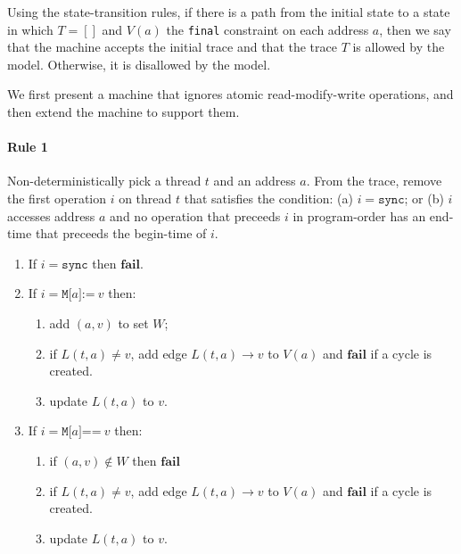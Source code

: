 \documentclass[11pt]{article}
\begin{document}
Using the state-transition rules, if there is a path from the initial
state to a state in which $T = []$ and $V(a)$ the \verb#final#
constraint on each address $a$, then we say that the machine accepts
the initial trace and that the trace $T$ is allowed by the model.
Otherwise, it is disallowed by the model.

We first present a machine that ignores atomic read-modify-write
operations, and then extend the machine to support them.

\paragraph{Rule 1}

Non-deterministically pick a thread $t$ and an address $a$.  From the
trace, remove the first operation $i$ on thread $t$ that satisfies the
condition: (a) $i = \texttt{sync}$; or (b) $i$ accesses address $a$
and no operation that preceeds $i$ in program-order has an end-time
that preceeds the begin-time of $i$.

\begin{enumerate}
\item 
     If $i = \texttt{sync}$ then $\textbf{fail}$.

\item 
     If $i = \texttt{M[}a\texttt{]:=}~v$ then:

\begin{enumerate}
\item
     add $(a, v)$ to set $W$;
\item
     if $L(t,a) \neq v$, add edge $L(t, a) \rightarrow v$ to $V(a)$
     and $\textbf{fail}$ if a cycle is created.
\item
     update $L(t,a)$ to $v$.
\end{enumerate}

\item 
     If $i = \texttt{M[}a\texttt{]==}~v$ then:

\begin{enumerate}
\item
     if $(a, v) \notin W$ then $\textbf{fail}$
\item
     if $L(t,a) \neq v$, add edge $L(t, a) \rightarrow v$ to $V(a)$
     and $\textbf{fail}$ if a cycle is created.
\item
     update $L(t,a)$ to $v$.
\end{enumerate}

\end{enumerate}
\end{document}
